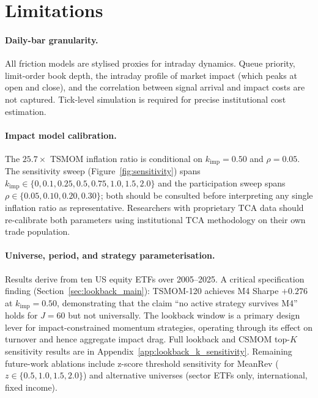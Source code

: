 \documentclass[12pt]{article}
\newcommand{\kimp}{k_{\mathrm{imp}}}
\begin{document}
\section{Limitations}
\label{sec:limitations}

\paragraph{Daily-bar granularity.}
All friction models are stylised proxies for intraday dynamics.
Queue priority, limit-order book depth, the intraday profile of
market impact (which peaks at open and close), and the correlation
between signal arrival and impact costs are not captured.
Tick-level simulation is required for precise institutional cost
estimation.

\paragraph{Impact model calibration.}
The $25.7\times$ TSMOM inflation ratio is conditional on $\kimp = 0.50$
and $\rho = 0.05$. The sensitivity sweep (Figure~\ref{fig:sensitivity})
spans $\kimp \in \{0, 0.1, 0.25, 0.5, 0.75, 1.0, 1.5, 2.0\}$ and the
participation sweep spans $\rho \in \{0.05, 0.10, 0.20, 0.30\}$;
both should be consulted before interpreting any single inflation
ratio as representative. Researchers with proprietary TCA data should
re-calibrate both parameters using institutional TCA methodology
\citep[see][]{lillo2003master} on their own trade population.

\paragraph{Universe, period, and strategy parameterisation.}
Results derive from ten US equity ETFs over 2005--2025. A critical
specification finding (Section~\ref{sec:lookback_main}): TSMOM-120
achieves M4 Sharpe $+0.276$ at $\kimp=0.50$, demonstrating
that the claim ``no active strategy survives M4'' holds for $J=60$
but not universally. The lookback window is a primary design lever
for impact-constrained momentum strategies, operating through
its effect on turnover and hence aggregate impact drag.
Full lookback and CSMOM top-$K$ sensitivity results are in
Appendix~\ref{app:lookback_k_sensitivity}. Remaining future-work
ablations include z-score threshold sensitivity for MeanRev
($z \in \{0.5, 1.0, 1.5, 2.0\}$) and alternative universes
(sector ETFs only, international, fixed income).
\end{document}
